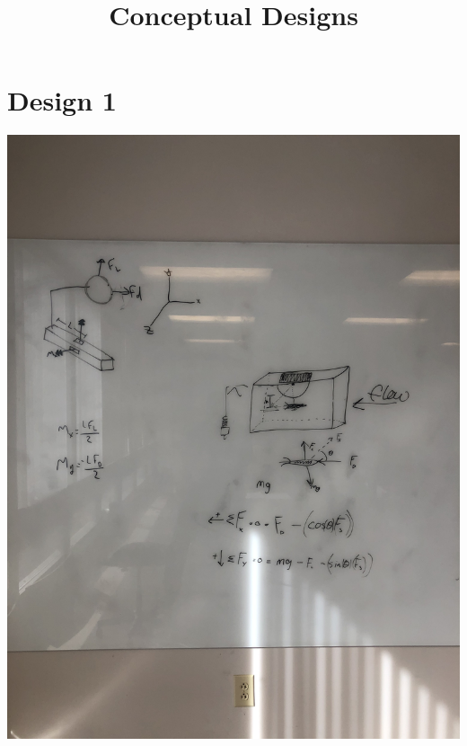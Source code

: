 \documentclass[12pt, letterpaper]{article}
\begin{document}
	\title{Conceptual Designs}
	\section{Design 1}
		\includegraphics[width = \textwidth]{IMG_6613.jpg}
\end{document}
